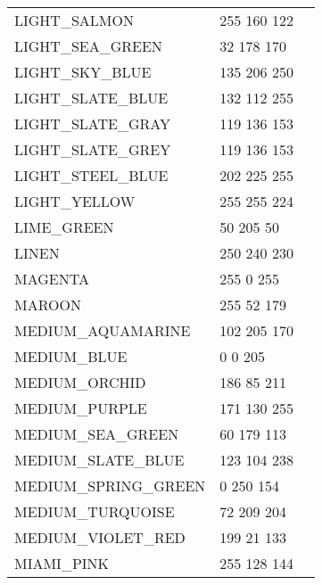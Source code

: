 \documentclass{article}
\begin{document}
\begin{longtable}{lll}
LIGHT\_SALMON & 255 160 122 & \colorbox[RGB]{255 160 122}{\phantom{MMMMMMMM}}\\
LIGHT\_SEA\_GREEN & 32 178 170 & \colorbox[RGB]{32 178 170}{\phantom{MMMMMMMM}}\\
LIGHT\_SKY\_BLUE & 135 206 250 & \colorbox[RGB]{135 206 250}{\phantom{MMMMMMMM}}\\
LIGHT\_SLATE\_BLUE & 132 112 255 & \colorbox[RGB]{132 112 255}{\phantom{MMMMMMMM}}\\
LIGHT\_SLATE\_GRAY & 119 136 153 & \colorbox[RGB]{119 136 153}{\phantom{MMMMMMMM}}\\
LIGHT\_SLATE\_GREY & 119 136 153 & \colorbox[RGB]{119 136 153}{\phantom{MMMMMMMM}}\\
LIGHT\_STEEL\_BLUE & 202 225 255 & \colorbox[RGB]{202 225 255}{\phantom{MMMMMMMM}}\\
LIGHT\_YELLOW & 255 255 224 & \colorbox[RGB]{255 255 224}{\phantom{MMMMMMMM}}\\
LIME\_GREEN & 50 205 50 & \colorbox[RGB]{50 205 50}{\phantom{MMMMMMMM}}\\
LINEN & 250 240 230 & \colorbox[RGB]{250 240 230}{\phantom{MMMMMMMM}}\\
MAGENTA & 255 0 255 & \colorbox[RGB]{255 0 255}{\phantom{MMMMMMMM}}\\
MAROON & 255 52 179 & \colorbox[RGB]{255 52 179}{\phantom{MMMMMMMM}}\\
MEDIUM\_AQUAMARINE & 102 205 170 & \colorbox[RGB]{102 205 170}{\phantom{MMMMMMMM}}\\
MEDIUM\_BLUE & 0 0 205 & \colorbox[RGB]{0 0 205}{\phantom{MMMMMMMM}}\\
MEDIUM\_ORCHID & 186 85 211 & \colorbox[RGB]{186 85 211}{\phantom{MMMMMMMM}}\\
MEDIUM\_PURPLE & 171 130 255 & \colorbox[RGB]{171 130 255}{\phantom{MMMMMMMM}}\\
MEDIUM\_SEA\_GREEN & 60 179 113 & \colorbox[RGB]{60 179 113}{\phantom{MMMMMMMM}}\\
MEDIUM\_SLATE\_BLUE & 123 104 238 & \colorbox[RGB]{123 104 238}{\phantom{MMMMMMMM}}\\
MEDIUM\_SPRING\_GREEN & 0 250 154 & \colorbox[RGB]{0 250 154}{\phantom{MMMMMMMM}}\\
MEDIUM\_TURQUOISE & 72 209 204 & \colorbox[RGB]{72 209 204}{\phantom{MMMMMMMM}}\\
MEDIUM\_VIOLET\_RED & 199 21 133 & \colorbox[RGB]{199 21 133}{\phantom{MMMMMMMM}}\\
MIAMI\_PINK & 255 128 144 & \colorbox[RGB]{255 128 144}{\phantom{MMMMMMMM}}\\

\end{longtable}
\end{document}
